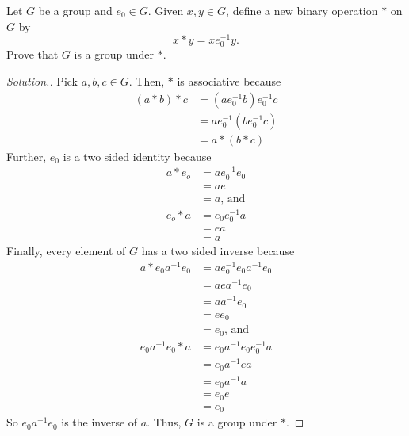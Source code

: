 \documentclass{article}
\newcounter{exercise}
\newenvironment{exercise}{\addtocounter{exercise}{1} \noindent{\bf{Exercise \theexercise.}}}{\vspace{.5cm}}
\begin{document}
\begin{exercise}
Let $G$ be a group and $e_0 \in G$.  Given $x, y \in G$, define a new binary operation $\ast$ on $G$ by 
\[
x \ast y = x e_0^{-1} y.
\]  
Prove that $G$ is a group under $\ast$.
\end{exercise}

\begin{proof}[Solution.]
Pick $a,b,c\in G$. Then, $\ast$ is associative because 
\[
\begin{split}
   (a\ast b)\ast c &= (a e_0^{-1} b)e_0^{-1}c\\
        &=a e_0^{-1}( be_0^{-1}c)\\
        &= a\ast (b\ast c)
\end{split}
\]
Further, $e_0$ is a two sided identity because
\[
\begin{split}
   a\ast e_o&= a e_0^{-1} e_0\\
        &=a e\\
        &= a \text{, \ and}\\
     e_o\ast a&= e_0 e_0^{-1} a\\
        &=ea\\
        &= a
\end{split}
\]
Finally, every element of $G$ has a two sided inverse because
\[
\begin{split}
   a\ast e_0 a^{-1}e_0&= a e_0^{-1} e_0 a^{-1}e_0\\
        &=a e a^{-1}e_0\\
        &=a a^{-1}e_0\\
        &=e e_0\\
        &= e_0 \text{, \ and}\\
     e_0 a^{-1}e_0\ast a&= e_0a^{-1}e_0 e_0^{-1} a\\
        &=e_0a^{-1}e a\\
        &=e_0a^{-1} a\\
        &=e_0e\\
        &= e_0
\end{split}
\]
So $e_0 a^{-1}e_0$ is the inverse of $a$. Thus, $G$ is a group under $\ast$.
\end{proof}
\end{document}
